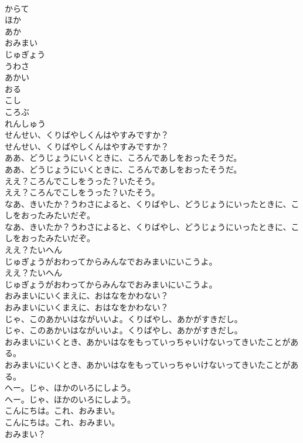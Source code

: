 \documentclass[8pt]{extreport}
\begin{document}
\begin{CJK}{UTF8}{min}
\\	からて
\\	ほか
\\	あか
\\	おみまい
\\	じゅぎょう
\\	うわさ
\\	あかい
\\	おる
\\	こし
\\	ころぶ
\\	れんしゅう
\\	せんせい、くりばやしくんはやすみですか？
\\	せんせい、くりばやしくんはやすみですか？
\\	ああ、どうじょうにいくときに、ころんであしをおったそうだ。
\\	ああ、どうじょうにいくときに、ころんであしをおったそうだ。
\\	ええ？ころんでこしをうった？いたそう。
\\	ええ？ころんでこしをうった？いたそう。
\\	なあ、きいたか？うわさによると、くりばやし、どうじょうにいったときに、こしをおったみたいだぞ。
\\	なあ、きいたか？うわさによると、くりばやし、どうじょうにいったときに、こしをおったみたいだぞ。
\\	ええ？たいへん
\\	じゅぎょうがおわってからみんなでおみまいにいこうよ。
\\	ええ？たいへん
\\	じゅぎょうがおわってからみんなでおみまいにいこうよ。
\\	おみまいにいくまえに、おはなをかわない？
\\	おみまいにいくまえに、おはなをかわない？
\\	じゃ、このあかいはながいいよ。くりばやし、あかがすきだし。
\\	じゃ、このあかいはながいいよ。くりばやし、あかがすきだし。
\\	おみまいにいくとき、あかいはなをもっていっちゃいけないってきいたことがある。
\\	おみまいにいくとき、あかいはなをもっていっちゃいけないってきいたことがある。
\\	へー。じゃ、ほかのいろにしよう。
\\	へー。じゃ、ほかのいろにしよう。
\\	こんにちは。これ、おみまい。
\\	こんにちは。これ、おみまい。
\\	おみまい？

\end{CJK}
\end{document}
